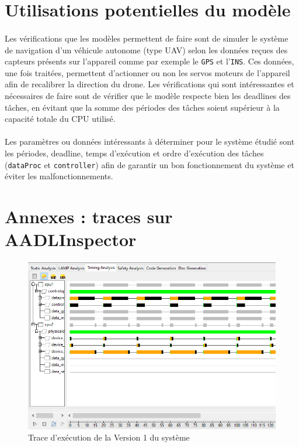 \documentclass[a4paper,12pt]{report}
\begin{document}
	\section{Utilisations potentielles du modèle}
		\paragraph*{}
		Les vérifications que les modèles permettent de faire sont de simuler le système de navigation d'un véhicule autonome (type UAV) selon les données reçues des capteurs présents sur l'appareil comme par exemple le \texttt{GPS} et l'\texttt{INS}. Ces données, une fois traitées, permettent d'actionner ou non les servos moteurs de l'appareil afin de recalibrer la direction du drone. Les vérifications qui sont intéressantes et nécessaires de faire sont de vérifier que le modèle respecte bien les deadlines des tâches, en évitant que la somme des périodes des tâches soient supérieur à la capacité totale du CPU utilisé.
		
		
		\paragraph*{}
		Les paramètres ou données intéressants à déterminer pour le système étudié sont les périodes, deadline, temps d'exécution et ordre d'exécution des tâches (\texttt{dataProc} et \texttt{controller}) afin de garantir un bon fonctionnement du système et éviter les malfonctionnements.
		
		
		
	\section{Annexes : traces sur AADLInspector}
		\label{traces}
	
		\begin{figure}[H]
			\centering
				\includegraphics[scale=0.5]{execV1.png}
				\caption{Trace d'exécution de la Version 1 du système}
			\label{execV1}
		\end{figure}
		
\end{document}
